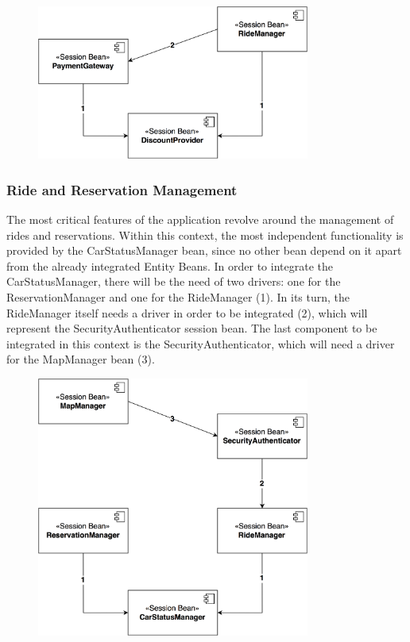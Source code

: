 \begin{figure}[H]
\begin{center}
		\includegraphics[width=0.8\textwidth]{./integration_strategy/diagrams/payment.png}
\end{center}
\end{figure}

\subsubsection{Ride and Reservation Management}
The most critical features of the application revolve around the management of rides and reservations. Within this context, the most independent functionality is provided by the CarStatusManager bean, since no other bean depend on it apart from the already integrated Entity Beans. In order to integrate the CarStatusManager, there will be the need of two drivers: one for the ReservationManager and one for the RideManager (1).
\noindent
In its turn, the RideManager itself needs a driver in order to be integrated (2), which will represent the SecurityAuthenticator session bean.
\noindent
The last component to be integrated in this context is the SecurityAuthenticator, which will need a driver for the MapManager bean (3).

\begin{figure}[H]
\begin{center}
		\includegraphics[width=0.8\textwidth]{./integration_strategy/diagrams/ride_reservation.png}
\end{center}
\end{figure}

